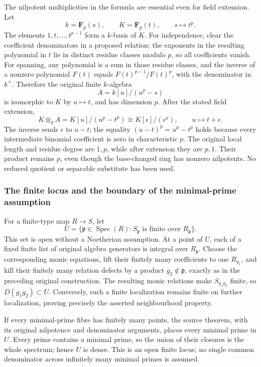 The nilpotent multiplicities in the formula are essential even for field extension. Let \[
 k=\mathbf F_p(s),\qquad K=\mathbf F_p(t),
 \qquad s\longmapsto t^p.
\] The elements \(1,t,\ldots,t^{p-1}\) form a \(k\)-basis of \(K\). For independence, clear the coefficient denominators in a proposed relation: the exponents in the resulting polynomial in \(t\) lie in distinct residue classes modulo \(p\), so all coefficients vanish. For spanning, any polynomial is a sum in those residue classes, and the inverse of a nonzero polynomial \(F(t)\) equals \(F(t)^{p-1}/F(t)^p\), with the denominator in \(k^\times\). Therefore the original finite \(k\)-algebra \[
 A=k[u]/(u^p-s)
\] is isomorphic to \(K\) by \(u\mapsto t\), and has dimension \(p\). After the stated field extension, \[
 K\otimes_k A
 =K[u]/(u^p-t^p)
 \cong K[\epsilon]/(\epsilon^p),\qquad u\longmapsto t+\epsilon.
\] The inverse sends \(\epsilon\) to \(u-t\); the equality \((u-t)^p=u^p-t^p\) holds because every intermediate binomial coefficient is zero in characteristic \(p\). The original local length and residue degree are \(1,p\), while after extension they are \(p,1\). Their product remains \(p\), even though the base-changed ring has nonzero nilpotents. No reduced quotient or separable substitute has been used.

\subsubsection{The finite locus and the boundary of the minimal-prime assumption}\label{algebra-proof-031-the-finite-locus-and-the-boundary-of-the-minimal-prime-assumption}

For a finite-type map \(R\to S\), let \[
 U=\{\mathfrak p\in\operatorname{Spec}(R):
                     S_{\mathfrak p}\text{ is finite over }R_{\mathfrak p}\}.
\] This set is open without a Noetherian assumption. At a point of \(U\), each of a fixed finite list of original algebra generators is integral over \(R_{\mathfrak p}\). Choose the corresponding monic equations, lift their finitely many coefficients to one \(R_{g_1}\), and kill their finitely many relation defects by a product \(g_2\notin\mathfrak p\), exactly as in the preceding original construction. The resulting monic relations make \(S_{g_1g_2}\) finite, so \(D(g_1g_2)\subset U\). Conversely, such a finite localization remains finite on further localization, proving precisely the asserted neighbourhood property.

If every minimal-prime fibre has finitely many points, the source theorem, with its original nilpotence and denominator arguments, places every minimal prime in \(U\). Every prime contains a minimal prime, so the union of their closures is the whole spectrum; hence \(U\) is dense. This is an open finite locus; no single common denominator across infinitely many minimal primes is assumed.

